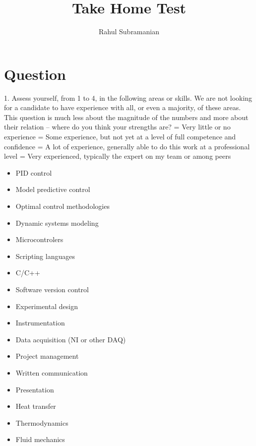\documentclass[11pt, oneside]{article}   	%
\title{\textbf{Take Home Test}}
\author{Rahul Subramanian}
\begin{document}
\maketitle

\newpage

\section{Question}
1. Assess yourself, from 1 to 4, in the following areas or skills. We are not looking for a candidate to have experience with all, or even a majority, of these areas. This question is much less about the magnitude of the numbers and more about their relation – where do you think your strengths are?
\newline
{} = Very little or no experience
 = Some experience, but not yet at a level of full competence and confidence
 = A lot of experience, generally able to do this work at a professional level
 = Very experienced, typically the expert on my team or among peers
\newline
\begin{itemize}
    \item PID control
    \item Model predictive control
    \item Optimal control methodologies
    \item Dynamic systems modeling
    \item Microcontrolers
    \item Scripting languages
    \item C/C++
    \item Software version control
    \item Experimental design
    \item Instrumentation
    \item Data acquisition (NI or other DAQ)
    \item Project management
    \item Written communication
    \item Presentation
    \item Heat transfer
    \item Thermodynamics
    \item Fluid mechanics
\end{itemize}
\end{document}
